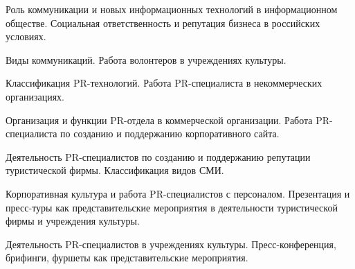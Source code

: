 \documentclass[
	14pt,
	a4paper,
	]
	{scrartcl}
\begin{document}
\newpage


\shapk
{}
\setcounter{zad}{0}

\vfill
\z Роль коммуникации и новых информационных технологий в информационном обществе.
 \vfill
\z Социальная ответственность и репутация бизнеса в российских условиях.
 \vfill

\vfill

\newpage


\shapk
{}
\setcounter{zad}{0}

\vfill
\z Виды коммуникаций.
 \vfill
\z Работа волонтеров в учреждениях культуры.
 \vfill

\vfill

\newpage


\shapk
{}
\setcounter{zad}{0}

\vfill
\z Классификация PR-технологий.
 \vfill
\z Работа PR-специалиста в некоммерческих организациях.
 \vfill

\vfill

\newpage


\shapk
{}
\setcounter{zad}{0}

\vfill
\z Организация и функции PR-отдела в коммерческой организации.
 \vfill
\z Работа PR-специалиста по созданию и поддержанию корпоративного сайта.
 \vfill

\vfill

\newpage


\shapk
{}
\setcounter{zad}{0}

\vfill
\z Деятельность PR-специалистов по созданию и поддержанию репутации туристической фирмы.
 \vfill
\z Классификация видов СМИ.
 \vfill

\vfill

\newpage


\shapk
{}
\setcounter{zad}{0}

\vfill
\z Корпоративная культура и работа PR-специалистов с персоналом.
 \vfill
\z Презентация и пресс-туры как представительские мероприятия в деятельности туристической фирмы и учреждения культуры.
 \vfill

\vfill

\newpage


\shapk
{}
\setcounter{zad}{0}

\vfill
\z Деятельность PR-специалистов в учреждениях культуры.
 \vfill
\z Пресс-конференция, брифинги, фуршеты как представительские мероприятия.
 \vfill
\end{document}
